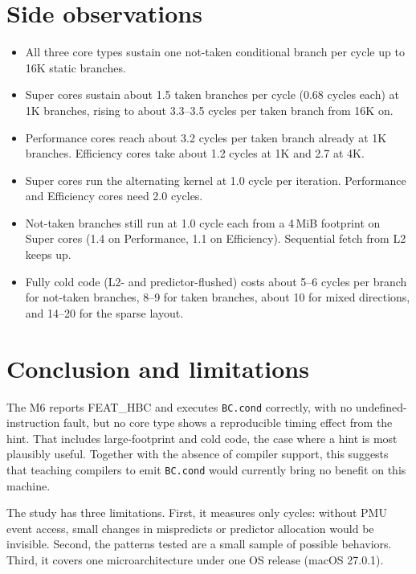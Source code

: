 \documentclass[10pt]{article}
\begin{document}
\section{Side observations}
\begin{itemize}
  \item All three core types sustain one not-taken conditional branch per cycle up to 16K
        static branches.
  \item Super cores sustain about 1.5 taken branches per cycle (0.68 cycles each) at 1K
        branches, rising to about 3.3--3.5 cycles per taken branch from 16K on.
  \item Performance cores reach about 3.2 cycles per taken branch already at 1K branches.
        Efficiency cores take about 1.2 cycles at 1K and 2.7 at 4K.
  \item Super cores run the alternating kernel at 1.0 cycle per iteration. Performance and
        Efficiency cores need 2.0 cycles.
  \item Not-taken branches still run at 1.0 cycle each from a 4\,MiB footprint on Super cores
        (1.4 on Performance, 1.1 on Efficiency). Sequential fetch from L2 keeps up.
  \item Fully cold code (L2- and predictor-flushed) costs about 5--6 cycles per branch for
        not-taken branches, 8--9 for taken branches, about 10 for mixed directions, and
        14--20 for the sparse layout.
\end{itemize}

\section{Conclusion and limitations}
The M6 reports FEAT\_HBC and executes \texttt{BC.cond} correctly, with no undefined-instruction
fault, but no core type shows a reproducible timing effect from the hint. That includes
large-footprint and cold code, the case where a hint is most plausibly useful. Together with the
absence of compiler support, this suggests that teaching compilers to emit \texttt{BC.cond}
would currently bring no benefit on this machine.

The study has three limitations. First, it measures only cycles: without PMU event access,
small changes in mispredicts or predictor allocation would be invisible. Second, the
patterns tested are a small sample of possible behaviors. Third, it covers one
microarchitecture under one OS release (macOS 27.0.1).
\end{document}
